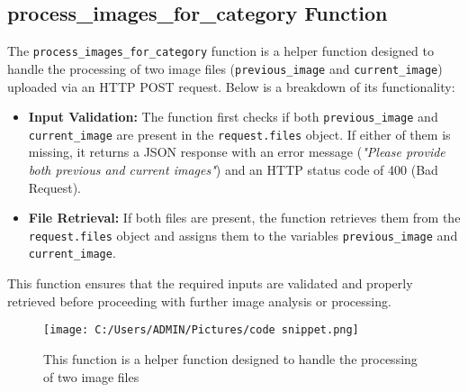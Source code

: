 \documentclass[12pt,a4paper]{report}
\begin{document}
\subsection{process\_images\_for\_category Function}
The \texttt{process\_images\_for\_category} function is a helper function designed to handle the processing of two image files (\texttt{previous\_image} and \texttt{current\_image}) uploaded via an HTTP POST request. Below is a breakdown of its functionality:

\begin{itemize}
    \item \textbf{Input Validation:} The function first checks if both \texttt{previous\_image} and \texttt{current\_image} are present in the \texttt{request.files} object. If either of them is missing, it returns a JSON response with an error message (\textit{"Please provide both previous and current images"}) and an HTTP status code of 400 (Bad Request).
    \item \textbf{File Retrieval:} If both files are present, the function retrieves them from the \texttt{request.files} object and assigns them to the variables \texttt{previous\_image} and \texttt{current\_image}.
\end{itemize}

This function ensures that the required inputs are validated and properly retrieved before proceeding with further image analysis or processing.

\begin{figure}[H]
    \centering
    \texttt{[image: C:/Users/ADMIN/Pictures/code snippet.png]} %
    \caption[Short caption for the image]{ This function is a helper function designed to handle the processing of two image files }
    \label{fig:sample_image}
\end{figure}
\end{document}
